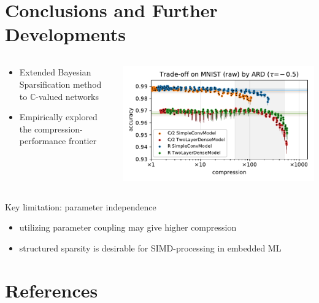 \documentclass{beamer}
\newcommand{\cplx}{\mathbb{C}}
\begin{document}

\section{Conclusions and Further Developments} %
\label{sec:conclusions_and_further_developments}

\begin{frame}[c]{\insertsection}
  \begin{columns}[T]
    \begin{column}{0.38\textwidth}
      \begin{itemize}
        \item Extended Bayesian Sparsification method to $\cplx$-valued networks
        \item Empirically explored the compression-performance frontier
      \end{itemize}
    \end{column}
    \begin{column}{0.58\textwidth}
      \includegraphics[scale=0.35,clip]{figure__mnist-like__trade-off/appendix__cmp__ARD__mnist__raw__-0.5.pdf}
    \end{column}
  \end{columns}

  \bigskip
  Key limitation: parameter independence %
  \begin{itemize}
    \item utilizing parameter coupling may give higher compression
    \item structured sparsity is desirable for SIMD-processing in embedded ML
  \end{itemize}

\end{frame}


\section{References} %
\label{sec:references}

\begin{frame}{\insertsection}
  \tiny
  
  
\end{frame}

\end{document}
